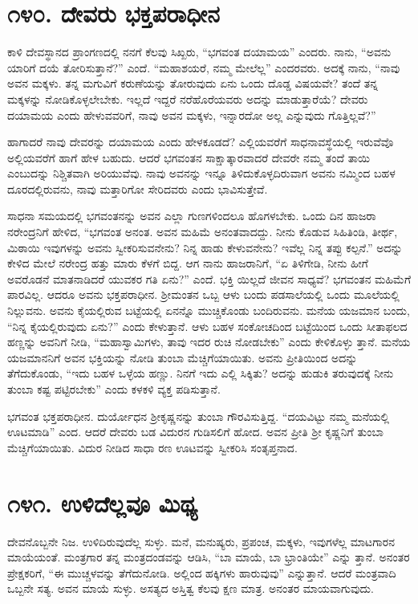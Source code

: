 \section{\num{೧೪೦. } ದೇವರು ಭಕ್ತಪರಾಧೀನ}

ಕಾಳಿ ದೇವಸ್ಥಾನದ ಪ್ರಾಂಗಣದಲ್ಲಿ ನನಗೆ ಕೆಲವು ಸಿಖ್ಖರು, “ಭಗವಂತ ದಯಾಮಯ” ಎಂದರು. ನಾನು, “ಅವನು ಯಾರಿಗೆ ದಯೆ ತೋರಿಸುತ್ತಾನೆ?” ಎಂದೆ. “ಮಹಾಶಯರೆ, ನಮ್ಮ ಮೇಲೆಲ್ಲ” ಎಂದರವರು. ಅದಕ್ಕೆ ನಾನು, “ನಾವು ಅವನ ಮಕ್ಕಳು. ತನ್ನ ಮಗುವಿಗೆ ಕರುಣೆಯನ್ನು ತೋರುವುದು ಏನು ಒಂದು ದೊಡ್ಡ ವಿಷಯವೇ? ತಂದೆ ತನ್ನ ಮಕ್ಕಳನ್ನು ನೋಡಿಕೊಳ್ಳಲೇಬೇಕು. ಇಲ್ಲದೆ ಇದ್ದರೆ ನರೆಹೊರೆಯವರು ಅದನ್ನು ಮಾಡುತ್ತಾರೆಯೆ? ದೇವರು ದಯಾಮಯ ಎಂದು ಹೇಳುವವರಿಗೆ, ನಾವು ಅವನ ಮಕ್ಕಳು, ಇನ್ನಾರದೋ ಅಲ್ಲ ಎನ್ನುವುದು ಗೊತ್ತಿಲ್ಲವೆ?”

ಹಾಗಾದರೆ ನಾವು ದೇವರನ್ನು ದಯಾಮಯ ಎಂದು ಹೇಳಕೂಡದೆ? ಎಲ್ಲಿಯವರೆಗೆ ಸಾಧನಾವಸ್ಥೆಯಲ್ಲಿ ಇರುವೆವೊ ಅಲ್ಲಿಯವರೆಗೆ ಹಾಗೆ ಹೇಳ ಬಹುದು. ಆದರೆ ಭಗವಂತನ ಸಾಕ್ಷಾತ್ಕಾರವಾದರೆ ದೇವರೇ ನಮ್ಮ ತಂದೆ ತಾಯಿ ಎಂಬುದನ್ನು ನಿಶ್ಚಿತವಾಗಿ ಅರಿಯುವೆವು. ನಾವು ಅವನನ್ನು ಇನ್ನೂ ತಿಳಿದುಕೊಳ್ಳದಿರುವಾಗ ಅವನು ನಮ್ಮಿಂದ ಬಹಳ ದೂರದಲ್ಲಿರುವನು, ನಾವು ಮತ್ತಾರಿಗೋ ಸೇರಿದವರು ಎಂದು ಭಾವಿಸುತ್ತೇವೆ.

ಸಾಧನಾ ಸಮಯದಲ್ಲಿ ಭಗವಂತನನ್ನು ಅವನ ಎಲ್ಲಾ ಗುಣಗಳಿಂದಲೂ ಹೊಗಳಬೇಕು. ಒಂದು ದಿನ ಹಾಜರಾ ನರೇಂದ್ರನಿಗೆ ಹೇಳಿದ, “ಭಗವಂತ ಅನಂತ. ಅವನ ಮಹಿಮೆ ಅನಂತವಾದದ್ದು. ನೀನು ಕೊಡುವ ಸಿಹಿತಿಂಡಿ, ತೀರ್ಥ, ಮಿಠಾಯಿ ಇವುಗಳನ್ನು ಅವನು ಸ್ವೀಕರಿಸುವನೇನು? ನಿನ್ನ ಹಾಡು ಕೇಳುವನೇನು? ಇವೆಲ್ಲ ನಿನ್ನ ತಪ್ಪು ಕಲ್ಪನೆ.” ಅದನ್ನು ಕೇಳಿದ ಮೇಲೆ ನರೇಂದ್ರ ಹತ್ತು ಮಾರು ಕೆಳಗೆ ಬಿದ್ದ. ಆಗ ನಾನು ಹಾಜರಾನಿಗೆ, “ಏ ತಿಳಿಗೇಡಿ, ನೀನು ಹೀಗೆ ಅವರೊಡನೆ ಮಾತನಾಡಿದರೆ ಯುವಕರ ಗತಿ ಏನು?” ಎಂದೆ. ಭಕ್ತಿ ಯಿಲ್ಲದೆ ಜೀವನ ಸಾಧ್ಯವೆ? ಭಗವಂತನ ಮಹಿಮೆಗೆ ಪಾರವಿಲ್ಲ. ಆದರೂ ಅವನು ಭಕ್ತಪರಾಧೀನ. ಶ್ರೀಮಂತನ ಒಬ್ಬ ಆಳು ಬಂದು ಪಡಸಾಲೆಯಲ್ಲಿ ಒಂದು ಮೂಲೆಯಲ್ಲಿ ನಿಲ್ಲುವನು. ಅವನು ಕೈಯಲ್ಲಿರುವ ಬಟ್ಟೆಯಲ್ಲಿ ಏನನ್ನೊ ಮುಚ್ಚಿಕೊಂಡು ಬಂದಿರುವನು. ಮನೆಯ ಯಜಮಾನ ಬಂದು, “ನಿನ್ನ ಕೈಯಲ್ಲಿರುವುದು ಏನು?” ಎಂದು ಕೇಳುತ್ತಾನೆ. ಆಳು ಬಹಳ ಸಂಕೋಚದಿಂದ ಬಟ್ಟೆಯಿಂದ ಒಂದು ಸೀತಾಫಲದ ಹಣ್ಣನ್ನು ಅವನಿಗೆ ನೀಡಿ, “ಮಹಾಸ್ವಾಮಿಗಳು, ತಾವು ಇದರ ರುಚಿ ನೋಡಬೇಕು” ಎಂದು ಕೇಳಿಕೊಳ್ಳು ತ್ತಾನೆ. ಮನೆಯ ಯಜಮಾನನಿಗೆ ಅವನ ಭಕ್ತಿಯನ್ನು ನೋಡಿ ತುಂಬಾ ಮೆಚ್ಚಿಗೆಯಾಯಿತು. ಅವನು ಪ್ರೀತಿಯಿಂದ ಅದನ್ನು ತೆಗೆದುಕೊಂಡು, “ಇದು ಬಹಳ ಒಳ್ಳೆಯ ಹಣ್ಣು. ನಿನಗೆ ಇದು ಎಲ್ಲಿ ಸಿಕ್ಕಿತು? ಅದನ್ನು ಹುಡುಕಿ ತರುವುದಕ್ಕೆ ನೀನು ತುಂಬಾ ಕಷ್ಟ ಪಟ್ಟಿರಬೇಕು” ಎಂದು ಕಳಕಳಿ ವ್ಯಕ್ತ ಪಡಿಸುತ್ತಾನೆ.

ಭಗವಂತ ಭಕ್ತಪರಾಧೀನ. ದುರ್ಯೋಧನ ಶ್ರೀಕೃಷ್ಣನನ್ನು ತುಂಬಾ ಗೌರವಿಸುತ್ತಿದ್ದ. “ದಯವಿಟ್ಟು ನಮ್ಮ ಮನೆಯಲ್ಲಿ ಊಟಮಾಡಿ” ಎಂದ. ಆದರೆ ದೇವರು ಬಡ ವಿದುರನ ಗುಡಿಸಲಿಗೆ ಹೋದ. ಅವನ ಪ್ರೀತಿ ಶ್ರೀ ಕೃಷ್ಣನಿಗೆ ತುಂಬಾ ಮೆಚ್ಚಿಗೆಯಾಯಿತು. ವಿದುರ ನೀಡಿದ ಸಾಧಾ ರಣ ಊಟವನ್ನು ಸ್ವೀಕರಿಸಿ ಸಂತೃಪ್ತನಾದ.


\section{\num{೧೪೧. } ಉಳಿದೆಲ್ಲವೂ ಮಿಥ್ಯ}

ದೇವನೊಬ್ಬನೇ ನಿಜ. ಉಳಿದಿರುವುದೆಲ್ಲ ಸುಳ್ಳು. ಮನೆ, ಮನುಷ್ಯರು, ಪ್ರಪಂಚ, ಮಕ್ಕಳು, ಇವುಗಳೆಲ್ಲ ಮಾಟಗಾರನ ಮಾಯೆಯಂತೆ. ಮಂತ್ರಗಾರ ತನ್ನ ಮಂತ್ರದಂಡವನ್ನು ಆಡಿಸಿ, “ಬಾ ಮಾಯೆ, ಬಾ ಭ್ರಾಂತಿಯೇ” ಎನ್ನು ತ್ತಾನೆ. ಅನಂತರ ಪ್ರೇಕ್ಷಕರಿಗೆ, “ಈ ಮುಚ್ಚಳವನ್ನು ತೆಗೆದುನೋಡಿ. ಅಲ್ಲಿಂದ ಹಕ್ಕಿಗಳು ಹಾರುವುವು” ಎನ್ನುತ್ತಾನೆ. ಆದರೆ ಮಂತ್ರವಾದಿ ಒಬ್ಬನೇ ಸತ್ಯ. ಅವನ ಮಾಯೆ ಸುಳ್ಳು. ಅಸತ್ಯದ ಅಸ್ತಿತ್ವ ಕೆಲವು ಕ್ಷಣ ಮಾತ್ರ. ಅನಂತರ ಮಾಯವಾಗುವುದು.


